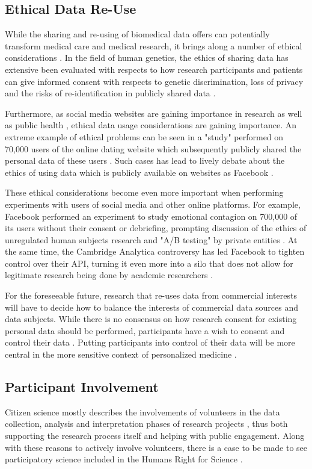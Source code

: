 \documentclass[a4paper,num-refs]{oup-contemporary}
\begin{document}
\subsection{Ethical Data Re-Use}
While the sharing and re-using of biomedical data offers can potentially transform medical care and medical research, it brings along a number of ethical considerations \cite{Mason2017, Ross2018}. In the field of human genetics, the ethics of sharing data has extensive been evaluated with respects to how research participants and patients can give informed consent with respects to genetic discrimination, loss of privacy and the risks of re-identification in publicly shared data \cite{Haeusermann2017, Wang2016}.

Furthermore, as social media websites are gaining importance in research as well as public health \cite{Samerski2018}, ethical data usage considerations are gaining importance. An extreme example of ethical problems  can be seen in a "study" performed on 70,000 users of the online dating website which subsequently publicly shared the personal data of these users \cite{okcupid}. Such cases has lead to lively debate about the ethics of using data which is publicly available on websites as Facebook \cite{Zimmer2010, Zook2017}. 

These ethical considerations become even more important when performing experiments with users of social media and other online platforms. For example, Facebook performed an experiment to study emotional contagion on 700,000 of its users without their consent or debriefing, prompting discussion of the ethics of unregulated human subjects research and "A/B testing" by private entities \cite{Jouhki2016, Hunter2016, Flick2015}. At the same time, the Cambridge Analytica controversy has led Facebook to tighten control over their API, turning it even more into a silo that does not allow for legitimate research being done by academic researchers \cite{facebook_silo}.

For the foreseeable future, research that re-uses data from commercial interests will have to decide how to balance the interests of commercial data sources and data subjects. While there is no consensus on how research consent for existing personal data should be performed, participants have a wish to consent and control their data \cite{Golder2017}. Putting participants into control of their data will be more central in the more sensitive context of personalized medicine \cite{Kossmann2014}.


\subsection{Participant Involvement}
Citizen science mostly describes the involvements of volunteers in the data collection, analysis and interpretation phases of research projects \cite{Pocock2017}, thus both supporting the research process itself and helping with public engagement. Along with these reasons to actively involve volunteers, there is a case to be made to see participatory science included in the Humans Right for Science \cite{Vayena2015a}. 
\end{document}
